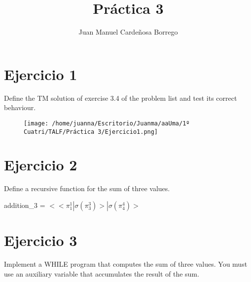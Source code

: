 \documentclass[11pt]{article}
\title{\textbf{Práctica 3}}
\author{Juan Manuel Cardeñosa Borrego}
\date{}
\begin{document}
\maketitle
\thispagestyle{empty}

\section*{Ejercicio 1}
Define the TM solution of exercise 3.4 of the problem list and test its correct
behaviour.

\begin{figure}[htp]
\centering
\texttt{[image: /home/juanna/Escritorio/Juanma/aaUma/1º Cuatri/TALF/Práctica 3/Ejercicio1.png]}

\end{figure}

\section*{Ejercicio 2}
Define a recursive function for the sum of three values.\\

\begin{center}
addition\_3 = $<<\pi^1_1|\sigma\left(\pi^3_3\right)>|\sigma\left(\pi^4_4\right)>$
\end{center}

\newpage
\section*{Ejercicio 3}
Implement a WHILE program that computes the sum of three values. You must use an auxiliary variable that accumulates the result of the sum.


\begin{whilecode}[H]

 
 \Assig{}
\end{whilecode}
\end{document}
